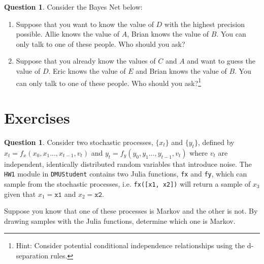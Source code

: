 \documentclass{article}
\theoremstyle{definition}
\newtheorem{question}[thm]{Question}
\begin{document}
\begin{samepage}
\begin{question}
    Consider the Bayes Net below:
\begin{center}
\end{center}

\begin{enumerate}[label=(\alph*)]
    \item Suppose that you want to know the value of $D$ with the highest precision possible. Allie knows the value of $A$, Brian knows the value of $B$. You can only talk to one of these people. Who should you ask?
    \item Suppose that you already know the values of $C$ and $A$ and want to guess the value of $D$. Eric knows the value of $E$ and Brian knows the value of $B$. You can only talk to one of these people. Who should you ask?\footnote{Hint: Consider potential conditional independence relationships using the d-separation rules.}
\end{enumerate}
\end{question}
\end{samepage}

\section{Exercises}

\begin{question}
    Consider two stochastic processes, $\{x_t\}$ and $\{y_t\}$, defined by $x_t = f_x(x_{0}, x_{1}... , x_{t-1}, v_t)$ and $y_t = f_y(y_{0}, y_{1}... , y_{t-1}, v_t)$ where $v_t$ are independent, identically distributed random variables that introduce noise. The \texttt{HW1} module in \texttt{DMUStudent} contains two Julia functions, \texttt{fx} and \texttt{fy}, which can sample from the stochastic processes, i.e. \texttt{fx([x1, x2])} will return a sample of $x_3$ given that $x_1 = \texttt{x1}$ and $x_2 = \texttt{x2}$.

    Suppose you know that one of these processes is Markov and the other is not. By drawing samples with the Julia functions, determine which one is Markov.
\end{question}
\end{document}
